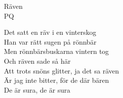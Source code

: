   {\Large Räven}\\{\tiny  PQ}
  \begin{vers}
Det satt en räv i en vinterskog\\
Han var rätt sugen på rönnbär\\
Men rönnbärsbuskarna vintern tog\\
Och räven sade så här\\
Att trots snöns glitter, ja det sa räven \\
Är jag inte bitter, för de där bären\\
De är sura, de är sura\\
\end{vers}
 